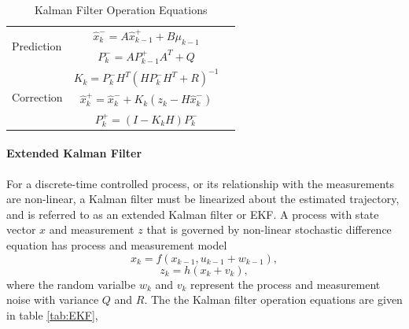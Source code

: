 \begin{table}
\caption{Kalman Filter Operation Equations}
\label{tab:KF}
\centering
\begin{tabular}{|l|c r|}
\hline
\multirow{2}{*}{Prediction} 
& $\hat{x}^-_k=A\hat{x}^+_{k-1}+B\mu_{k-1}$ & \stepcounter{equation}\tetab{\theequation}\\
& $P^-_k = AP^+_{k-1}A^T+Q$ & \stepcounter{equation}\tetab{\theequation}\\
\hline
\multirow{3}{*}{Correction}
& $K_k=P^-_kH^T(HP^-_kH^T+R)^{-1}$  & \stepcounter{equation}\tetab{\theequation}\\
& $\hat{x}^+_k = \hat{x}^-_k+K_k(z_k-H\hat{x}^-_k)$ & \stepcounter{equation}\tetab{\theequation}\\
& $P^+_k = (I-K_kH)P^-_k$ & \stepcounter{equation}\tetab{\theequation}\\
\hline
\end{tabular}
\end{table}
\FloatBarrier

\paragraph{Extended Kalman Filter}
For a discrete-time controlled process, or its relationship with the
measurements are non-linear, a Kalman filter must be linearized about
the estimated trajectory, and is referred to as an extended Kalman
filter or EKF. A process with state vector $x$ and measurement $z$
that is governed by non-linear stochastic difference equation has
process and measurement model 
\begin{equation}
x_k=f(x_{k-1}, u_{k-1}+w_{k-1}),
\end{equation}
\begin{equation}
z_k=h(x_k+v_k),
\end{equation}
\noindent where the random varialbe $w_k$ and $v_k$ represent the
process and measurement noise with variance $Q$ and $R$. The the
Kalman filter operation equations are given in table
\ref{tab:EKF},

